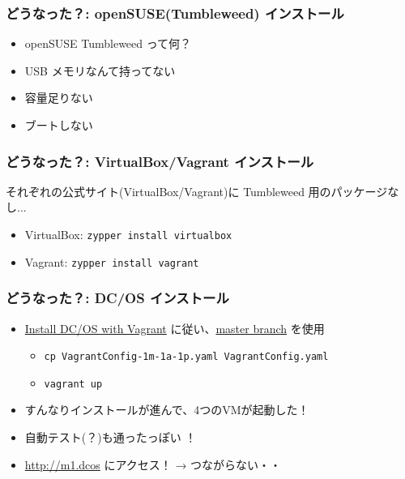 \documentclass[aspectratio=169,11pt,hyperref={colorlinks=true}]{beamer}
\begin{document}
\begin{frame}
  \frametitle{どうなった？: openSUSE(Tumbleweed) インストール}
  \begin{itemize}
    \item openSUSE Tumbleweed って何？ %
    \item USB メモリなんて持ってない %
    \item 容量足りない
    \item ブートしない %
  \end{itemize}
\end{frame}

\begin{frame}
  \frametitle{どうなった？: VirtualBox/Vagrant インストール}
  それぞれの公式サイト(VirtualBox/Vagrant)に Tumbleweed 用のパッケージなし...
  \begin{itemize}
    \item VirtualBox: \lstinline[basicstyle=\ttfamily\footnotesize,columns=fixed]{zypper install virtualbox}
    \item Vagrant: \lstinline[basicstyle=\ttfamily\footnotesize,columns=fixed]{zypper install vagrant}
  \end{itemize}
\end{frame}

\begin{frame}
  \frametitle{どうなった？: DC/OS インストール}
  \begin{itemize}
    \item \href{https://dcos.io/docs/1.9/installing/local/}{Install DC/OS with Vagrant} に従い、\href{https://github.com/dcos/dcos-vagrant/}{master branch} を使用
    \begin{itemize}
      \item \lstinline[basicstyle=\ttfamily\footnotesize,columns=fixed]{cp VagrantConfig-1m-1a-1p.yaml VagrantConfig.yaml}
      \item \lstinline[basicstyle=\ttfamily\footnotesize,columns=fixed]{vagrant up}
    \end{itemize}
    \item すんなりインストールが進んで、4つのVMが起動した！
    \item 自動テスト(？)も通ったっぽい ！
    \item \url{http://m1.dcos} にアクセス！ → つながらない・・
  \end{itemize}
\end{frame}
\end{document}
